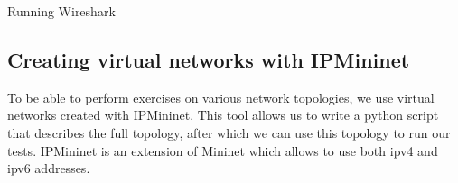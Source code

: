 \begin{exercise}{Running Wireshark}

\end{exercise}

\newpage
\subsection{Creating virtual networks with IPMininet}
To be able to perform exercises on various network topologies, we use virtual networks created with IPMininet. This tool allows us to write a python script that describes the full topology, after which we can use this topology to run our tests. IPMininet is an extension of Mininet which allows to use both \ac{ipv4} and \ac{ipv6} addresses.

